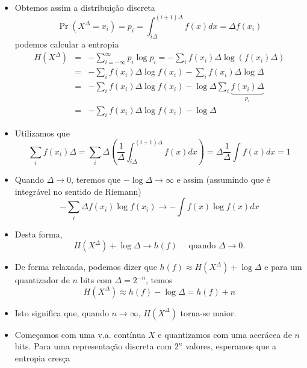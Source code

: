 \begin{frame}[allowframebreaks]
\begin{itemize}
\begin{equation}
	\end{equation}
  \item Obtemos assim a distribuição discreta
	\begin{equation}
	\Pr (X^\Delta = x_i) = p_i = \int_{i\Delta}^{(i+1)\Delta} f(x) dx = \Delta f(x_i)
	\end{equation}
	podemos calcular a entropia
	\begin{eqnarray}
	H(X^\Delta) &=& - \sum_{i=-\infty}^{\infty} p_i \log p_i = - \sum_i f(x_i) \Delta \log (f(x_i) \Delta) \\
		&=& -  \sum_i f(x_i) \Delta \log f(x_i)  - \sum_i f(x_i) \Delta \log \Delta \\
		&=& -  \sum_i f(x_i) \Delta \log f(x_i) - \log \Delta \sum_i \underbrace{f(x_i) \Delta}_{p_i} \\
		&=& -  \sum_i f(x_i) \Delta \log f(x_i) - \log \Delta
	\end{eqnarray}
  \item Utilizamos que
	\begin{equation}
	\sum_i f(x_i) \Delta = \sum_i \Delta \left( \frac{1}{\Delta} \int_{i\Delta}^{(i+1)\Delta} f(x) dx \right) = \Delta \frac{1}{\Delta} \int f(x) dx = 1
	\end{equation}
  \item Quando $\Delta \rightarrow 0$, teremos que $-\log \Delta \rightarrow \infty$ e assim (assumindo
	que é integrável no sentido de Riemann)
	\begin{equation}
	- \sum_i \Delta f(x_i) \log f(x_i) \rightarrow - \int f(x) \log f(x) dx
	\end{equation}
  \item Desta forma,
	\begin{equation}
	H(X^\Delta) + \log \Delta \rightarrow h(f) \quad \text{ quando } \Delta \rightarrow 0.
	\end{equation}
  \item De forma relaxada, podemos dizer que $h(f) \approx H(X^\Delta) + \log \Delta$ e para um quantizador de $n$ bits
	com $\Delta = 2^{-n}$, temos
	\begin{equation}
	H(X^\Delta) \approx h(f) - \log \Delta = h(f) + n
	\end{equation}
  \item Isto significa que, quando $n \rightarrow \infty$, $H(X^\Delta)$ torna-se maior.
  \item Começamos com uma v.a. contínua $X$ e quantizamos com uma acerácea de $n$ bits.
	Para uma representação discreta com $2^n$ valores, esperamos que a entropia cresça

\end{itemize}
\end{frame}
